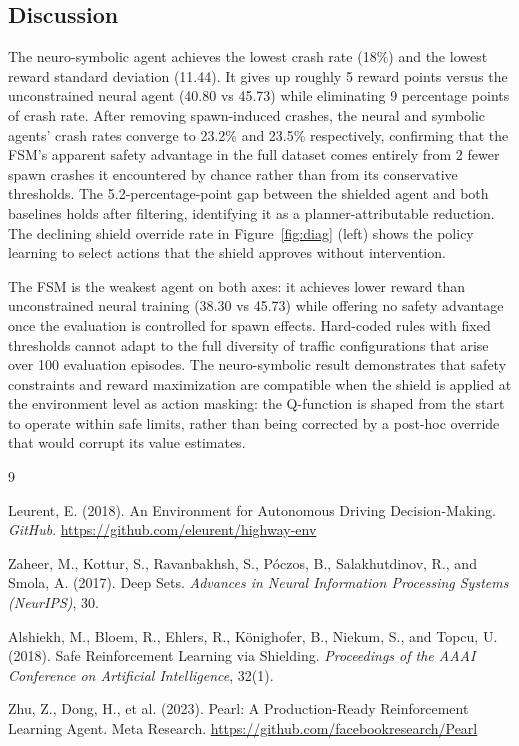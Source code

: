 \documentclass[11pt,a4paper]{article}
\begin{document}
\subsection{Discussion}

The neuro-symbolic agent achieves the lowest crash rate (18\%) and the lowest reward standard deviation (11.44). It gives up roughly 5 reward points versus the unconstrained neural agent (40.80 vs 45.73) while eliminating 9 percentage points of crash rate. After removing spawn-induced crashes, the neural and symbolic agents' crash rates converge to 23.2\% and 23.5\% respectively, confirming that the FSM's apparent safety advantage in the full dataset comes entirely from 2 fewer spawn crashes it encountered by chance rather than from its conservative thresholds. The 5.2-percentage-point gap between the shielded agent and both baselines holds after filtering, identifying it as a planner-attributable reduction. The declining shield override rate in Figure~\ref{fig:diag} (left) shows the policy learning to select actions that the shield approves without intervention.

The FSM is the weakest agent on both axes: it achieves lower reward than unconstrained neural training (38.30 vs 45.73) while offering no safety advantage once the evaluation is controlled for spawn effects. Hard-coded rules with fixed thresholds cannot adapt to the full diversity of traffic configurations that arise over 100 evaluation episodes. The neuro-symbolic result demonstrates that safety constraints and reward maximization are compatible when the shield is applied at the environment level as action masking: the Q-function is shaped from the start to operate within safe limits, rather than being corrected by a post-hoc override that would corrupt its value estimates.

\begin{thebibliography}{9}

  Leurent, E. (2018). An Environment for Autonomous Driving Decision-Making.
  \textit{GitHub}. \url{https://github.com/eleurent/highway-env}

  Zaheer, M., Kottur, S., Ravanbakhsh, S., P\'{o}czos, B., Salakhutdinov, R., and Smola, A. (2017).
  Deep Sets. \textit{Advances in Neural Information Processing Systems (NeurIPS)}, 30.

  Alshiekh, M., Bloem, R., Ehlers, R., K\"{o}nighofer, B., Niekum, S., and Topcu, U. (2018).
  Safe Reinforcement Learning via Shielding.
  \textit{Proceedings of the AAAI Conference on Artificial Intelligence}, 32(1).

  Zhu, Z., Dong, H., et al. (2023). Pearl: A Production-Ready Reinforcement Learning Agent.
  Meta Research. \url{https://github.com/facebookresearch/Pearl}

\end{thebibliography}
\end{document}
